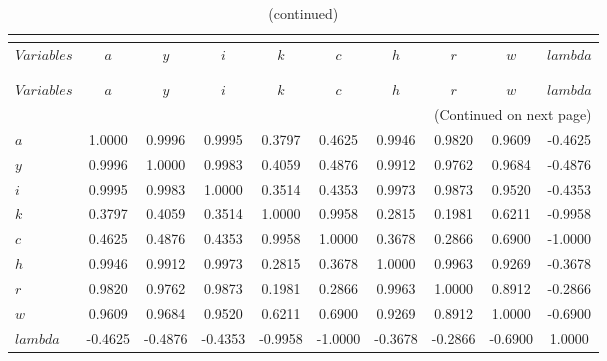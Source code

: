  
\begin{center}
\begin{longtable}{lccccccccc} 
\caption{MATRIX OF CORRELATIONS (HP filter, lambda = 1600)}\\
 \label{Table:th_corr_matrix}\\
\toprule 
$Variables  $	 & 	 $         a$	 & 	 $         y$	 & 	 $         i$	 & 	 $         k$	 & 	 $         c$	 & 	 $         h$	 & 	 $         r$	 & 	 $         w$	 & 	 $    lambda$\\
\midrule \endfirsthead 
\caption{(continued)}\\
 \toprule \\ 
$Variables  $	 & 	 $         a$	 & 	 $         y$	 & 	 $         i$	 & 	 $         k$	 & 	 $         c$	 & 	 $         h$	 & 	 $         r$	 & 	 $         w$	 & 	 $    lambda$\\
\midrule \endhead 
\midrule \multicolumn{10}{r}{(Continued on next page)} \\ \bottomrule \endfoot 
\bottomrule \endlastfoot 
$a          $	 & 	    1.0000	 & 	    0.9996	 & 	    0.9995	 & 	    0.3797	 & 	    0.4625	 & 	    0.9946	 & 	    0.9820	 & 	    0.9609	 & 	   -0.4625 \\ 
$y          $	 & 	    0.9996	 & 	    1.0000	 & 	    0.9983	 & 	    0.4059	 & 	    0.4876	 & 	    0.9912	 & 	    0.9762	 & 	    0.9684	 & 	   -0.4876 \\ 
$i          $	 & 	    0.9995	 & 	    0.9983	 & 	    1.0000	 & 	    0.3514	 & 	    0.4353	 & 	    0.9973	 & 	    0.9873	 & 	    0.9520	 & 	   -0.4353 \\ 
$k          $	 & 	    0.3797	 & 	    0.4059	 & 	    0.3514	 & 	    1.0000	 & 	    0.9958	 & 	    0.2815	 & 	    0.1981	 & 	    0.6211	 & 	   -0.9958 \\ 
$c          $	 & 	    0.4625	 & 	    0.4876	 & 	    0.4353	 & 	    0.9958	 & 	    1.0000	 & 	    0.3678	 & 	    0.2866	 & 	    0.6900	 & 	   -1.0000 \\ 
$h          $	 & 	    0.9946	 & 	    0.9912	 & 	    0.9973	 & 	    0.2815	 & 	    0.3678	 & 	    1.0000	 & 	    0.9963	 & 	    0.9269	 & 	   -0.3678 \\ 
$r          $	 & 	    0.9820	 & 	    0.9762	 & 	    0.9873	 & 	    0.1981	 & 	    0.2866	 & 	    0.9963	 & 	    1.0000	 & 	    0.8912	 & 	   -0.2866 \\ 
$w          $	 & 	    0.9609	 & 	    0.9684	 & 	    0.9520	 & 	    0.6211	 & 	    0.6900	 & 	    0.9269	 & 	    0.8912	 & 	    1.0000	 & 	   -0.6900 \\ 
$lambda     $	 & 	   -0.4625	 & 	   -0.4876	 & 	   -0.4353	 & 	   -0.9958	 & 	   -1.0000	 & 	   -0.3678	 & 	   -0.2866	 & 	   -0.6900	 & 	    1.0000 \\ 
\end{longtable}
 \end{center}
